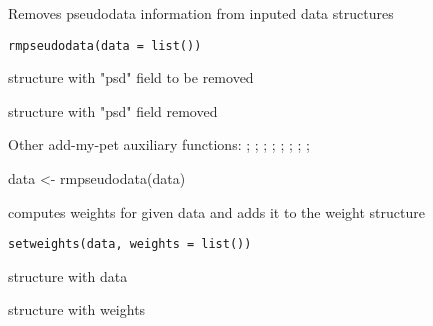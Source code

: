 \documentclass[a4paper]{book}
\begin{document}
%
\begin{Description}\relax
Removes pseudodata information from inputed data structures
\end{Description}
%
\begin{Usage}
\begin{verbatim}
rmpseudodata(data = list())
\end{verbatim}
\end{Usage}
%
\begin{Arguments}
\begin{ldescription}
\item[\code{data}] structure with "psd" field to be removed
\end{ldescription}
\end{Arguments}
%
\begin{Value}
structure with "psd" field removed
\end{Value}
%
\begin{SeeAlso}\relax
Other add-my-pet auxiliary functions: ;
; ;
; ;
; ;
; 
\end{SeeAlso}
%
\begin{Examples}
\begin{ExampleCode}
data <- rmpseudodata(data)
\end{ExampleCode}
\end{Examples}
%
\begin{Description}\relax
computes weights for given data and adds it to the weight structure
\end{Description}
%
\begin{Usage}
\begin{verbatim}
setweights(data, weights = list())
\end{verbatim}
\end{Usage}
%
\begin{Arguments}
\begin{ldescription}
\item[\code{data}] structure with data

\item[\code{weights}] structure with weights
\end{ldescription}
\end{Arguments}
\end{document}
